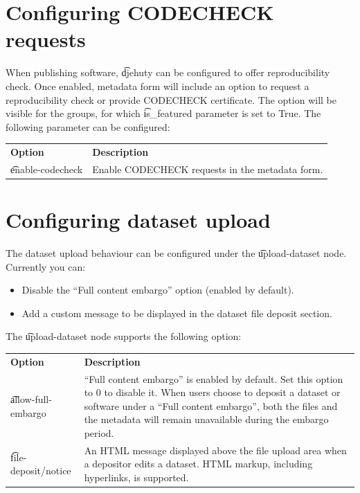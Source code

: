 \section{Configuring CODECHECK requests}

  When publishing software, \t{djehuty} can be configured to offer reproducibility check.
  Once enabled, metadata form will include an option to request a reproducibility check or provide CODECHECK certificate.
  The option will be visible for the groups, for which \t{is\_featured} parameter is set to True.
  The following parameter can be configured:

\begin{tabularx}{\textwidth}{*{1}{!{\VRule[-1pt]}l}!{\VRule[-1pt]}X}
  \headrow
  \textbf{Option}             & \textbf{Description}\\
  \t{enable-codecheck}        & Enable CODECHECK requests in the metadata form.
\end{tabularx}

\section{Configuring dataset upload}

  The dataset upload behaviour can be configured under the \t{upload-dataset}
  node.  Currently you can:

\begin{itemize}
  \item Disable the “Full content embargo” option (enabled by default).
  \item Add a custom message to be displayed in the dataset file deposit section.
\end{itemize}

  The \t{upload-dataset} node supports the following option:

\begin{tabularx}{\textwidth}{*{1}{!{\VRule[-1pt]}l}!{\VRule[-1pt]}X}
  \headrow
  \textbf{Option}             & \textbf{Description}\\
  \t{allow-full-embargo}      & ``Full content embargo'' is enabled by default.
                                Set this option to 0 to disable it. When users
                                choose to deposit a dataset or software under a
                                ``Full content embargo'', both the files and the
                                metadata will remain unavailable during the embargo
                                period.\\
  \t{file-deposit/notice}     & An HTML message displayed above the file upload
                                area when a depositor edits a dataset.  HTML
                                markup, including hyperlinks, is supported.
\end{tabularx}

